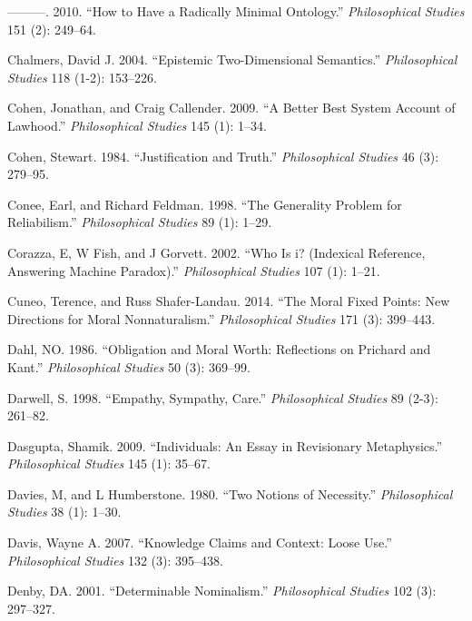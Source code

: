 \documentclass[
  10pt,
  letterpaper,
  DIV=11,
  numbers=noendperiod,
  twoside]{scrartcl}
\newlength{\cslhangindent}
\newenvironment{CSLReferences}[2] %
 {\begin{list}{}{%
  \setlength{\itemindent}{0pt}
  \setlength{\leftmargin}{0pt}
  \setlength{\parsep}{0pt}
  \ifodd #1
   \setlength{\leftmargin}{\cslhangindent}
   \setlength{\itemindent}{-1\cslhangindent}
  \fi
  \setlength{\itemsep}{#2\baselineskip}}}
 {\end{list}}
\begin{document}
\begin{CSLReferences}{1}{0}
---------. 2010. {``How to Have a Radically Minimal Ontology.''}
\emph{Philosophical Studies} 151 (2): 249--64.

Chalmers, David J. 2004. {``Epistemic Two-Dimensional Semantics.''}
\emph{Philosophical Studies} 118 (1-2): 153--226.

Cohen, Jonathan, and Craig Callender. 2009. {``A Better Best System
Account of Lawhood.''} \emph{Philosophical Studies} 145 (1): 1--34.

Cohen, Stewart. 1984. {``Justification and Truth.''} \emph{Philosophical
Studies} 46 (3): 279--95.

Conee, Earl, and Richard Feldman. 1998. {``The Generality Problem for
Reliabilism.''} \emph{Philosophical Studies} 89 (1): 1--29.

Corazza, E, W Fish, and J Gorvett. 2002. {``Who Is i? (Indexical
Reference, Answering Machine Paradox).''} \emph{Philosophical Studies}
107 (1): 1--21.

Cuneo, Terence, and Russ Shafer-Landau. 2014. {``The Moral Fixed Points:
New Directions for Moral Nonnaturalism.''} \emph{Philosophical Studies}
171 (3): 399--443.

Dahl, NO. 1986. {``Obligation and Moral Worth: Reflections on Prichard
and Kant.''} \emph{Philosophical Studies} 50 (3): 369--99.

Darwell, S. 1998. {``Empathy, Sympathy, Care.''} \emph{Philosophical
Studies} 89 (2-3): 261--82.

Dasgupta, Shamik. 2009. {``Individuals: An Essay in Revisionary
Metaphysics.''} \emph{Philosophical Studies} 145 (1): 35--67.

Davies, M, and L Humberstone. 1980. {``Two Notions of Necessity.''}
\emph{Philosophical Studies} 38 (1): 1--30.

Davis, Wayne A. 2007. {``Knowledge Claims and Context: Loose Use.''}
\emph{Philosophical Studies} 132 (3): 395--438.

Denby, DA. 2001. {``Determinable Nominalism.''} \emph{Philosophical
Studies} 102 (3): 297--327.


\end{CSLReferences}
\end{document}

